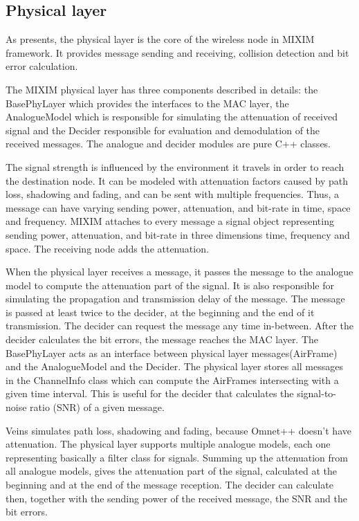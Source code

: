 \subsection{Physical layer}

As \cite{Kopke} presents, the physical layer is the core of the wireless node in
MIXIM framework. It provides message sending and receiving, collision detection
and bit error calculation.

The MIXIM physical layer has three components described in details: the
BasePhyLayer which provides the interfaces to the MAC layer, the AnalogueModel
which is responsible for simulating the attenuation of received signal and the
Decider responsible for evaluation and demodulation of the received messages.
The analogue and decider modules are pure C++ classes.

The signal strength is influenced by the environment it travels in order to
reach the destination node. It can be modeled with attenuation factors caused by
path loss, shadowing and fading, and can be sent with multiple frequencies.
Thus, a message can have varying sending power, attenuation, and bit-rate in
time, space and frequency. MIXIM attaches to every message a signal object
representing sending power, attenuation, and bit-rate in three dimensions time,
frequency and space. The receiving node adds the attenuation.

When the physical layer receives a message, it passes the message to the
analogue model to compute the attenuation part of the signal. It is
also responsible for simulating the propagation and transmission delay of the
message. The message is passed at least twice to the decider, at the beginning
and the end of it transmission. The decider can request the message any time
in-between. After the decider calculates the bit errors, the message reaches the
MAC layer. The BasePhyLayer acts as an interface between physical layer
messages(AirFrame) and the AnalogueModel and the Decider. The physical layer
stores all messages in the ChannelInfo class which can compute the AirFrames
intersecting with a given time interval. This is useful for the decider that
calculates the signal-to-noise ratio (SNR) of a given message.

Veins simulates path loss, shadowing and fading, because Omnet++ doesn't have
attenuation. The physical layer supports multiple analogue models, each one
representing basically a filter class for signals. Summing up the attenuation
from all analogue models, gives the attenuation part of the signal, calculated
at the beginning and at the end of the message reception. The decider can
calculate then, together with the sending power of the received message, the SNR
and the bit errors.

